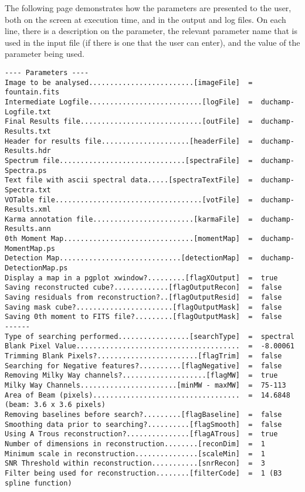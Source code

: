 The following page demonstrates how the parameters are presented to
the user, both on the screen at execution time, and in the output and
log files. On each line, there is a description on the parameter, the
relevant parameter name that is used in the input file (if there is
one that the user can enter), and the value of the parameter being
used.

\newpage
{\scriptsize
\begin{verbatim}
---- Parameters ----
Image to be analysed.........................[imageFile]  =  fountain.fits
Intermediate Logfile...........................[logFile]  =  duchamp-Logfile.txt
Final Results file.............................[outFile]  =  duchamp-Results.txt
Header for results file.....................[headerFile]  =  duchamp-Results.hdr
Spectrum file..............................[spectraFile]  =  duchamp-Spectra.ps
Text file with ascii spectral data.....[spectraTextFile]  =  duchamp-Spectra.txt
VOTable file...................................[votFile]  =  duchamp-Results.xml
Karma annotation file........................[karmaFile]  =  duchamp-Results.ann
0th Moment Map...............................[momentMap]  =  duchamp-MomentMap.ps
Detection Map.............................[detectionMap]  =  duchamp-DetectionMap.ps
Display a map in a pgplot xwindow?.........[flagXOutput]  =  true
Saving reconstructed cube?.............[flagOutputRecon]  =  false
Saving residuals from reconstruction?..[flagOutputResid]  =  false
Saving mask cube?.......................[flagOutputMask]  =  false
Saving 0th moment to FITS file?.........[flagOutputMask]  =  false
------
Type of searching performed.................[searchType]  =  spectral
Blank Pixel Value.......................................  =  -8.00061
Trimming Blank Pixels?........................[flagTrim]  =  false
Searching for Negative features?..........[flagNegative]  =  false
Removing Milky Way channels?....................[flagMW]  =  true
Milky Way Channels.......................[minMW - maxMW]  =  75-113
Area of Beam (pixels)...................................  =  14.6848   (beam: 3.6 x 3.6 pixels)
Removing baselines before search?.........[flagBaseline]  =  false
Smoothing data prior to searching?..........[flagSmooth]  =  false
Using A Trous reconstruction?...............[flagATrous]  =  true
Number of dimensions in reconstruction........[reconDim]  =  1
Minimum scale in reconstruction...............[scaleMin]  =  1
SNR Threshold within reconstruction...........[snrRecon]  =  3
Filter being used for reconstruction........[filterCode]  =  1 (B3 spline function)

\end{verbatim}}
